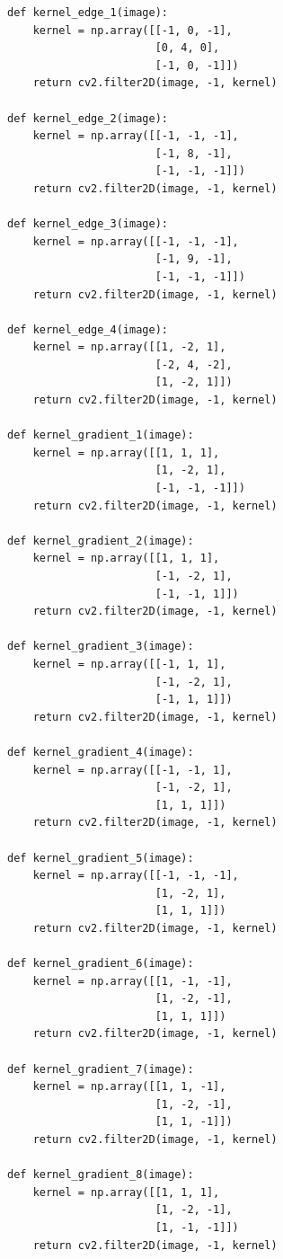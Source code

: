 \documentclass[a4paper,12pt]{article}
\begin{document}
\begin{lstlisting}[style=python]
def kernel_edge_1(image):
    kernel = np.array([[-1, 0, -1],
                       [0, 4, 0],
                       [-1, 0, -1]])
    return cv2.filter2D(image, -1, kernel)

def kernel_edge_2(image):
    kernel = np.array([[-1, -1, -1],
                       [-1, 8, -1],
                       [-1, -1, -1]])
    return cv2.filter2D(image, -1, kernel)

def kernel_edge_3(image):
    kernel = np.array([[-1, -1, -1],
                       [-1, 9, -1],
                       [-1, -1, -1]])
    return cv2.filter2D(image, -1, kernel)

def kernel_edge_4(image):
    kernel = np.array([[1, -2, 1],
                       [-2, 4, -2],
                       [1, -2, 1]])
    return cv2.filter2D(image, -1, kernel)

def kernel_gradient_1(image):
    kernel = np.array([[1, 1, 1],
                       [1, -2, 1],
                       [-1, -1, -1]])
    return cv2.filter2D(image, -1, kernel)

def kernel_gradient_2(image):
    kernel = np.array([[1, 1, 1],
                       [-1, -2, 1],
                       [-1, -1, 1]])
    return cv2.filter2D(image, -1, kernel)

def kernel_gradient_3(image):
    kernel = np.array([[-1, 1, 1],
                       [-1, -2, 1],
                       [-1, 1, 1]])
    return cv2.filter2D(image, -1, kernel)

def kernel_gradient_4(image):
    kernel = np.array([[-1, -1, 1],
                       [-1, -2, 1],
                       [1, 1, 1]])
    return cv2.filter2D(image, -1, kernel)

def kernel_gradient_5(image):
    kernel = np.array([[-1, -1, -1],
                       [1, -2, 1],
                       [1, 1, 1]])
    return cv2.filter2D(image, -1, kernel)

def kernel_gradient_6(image):
    kernel = np.array([[1, -1, -1],
                       [1, -2, -1],
                       [1, 1, 1]])
    return cv2.filter2D(image, -1, kernel)

def kernel_gradient_7(image):
    kernel = np.array([[1, 1, -1],
                       [1, -2, -1],
                       [1, 1, -1]])
    return cv2.filter2D(image, -1, kernel)

def kernel_gradient_8(image):
    kernel = np.array([[1, 1, 1],
                       [1, -2, -1],
                       [1, -1, -1]])
    return cv2.filter2D(image, -1, kernel)
\end{lstlisting}
\end{document}
